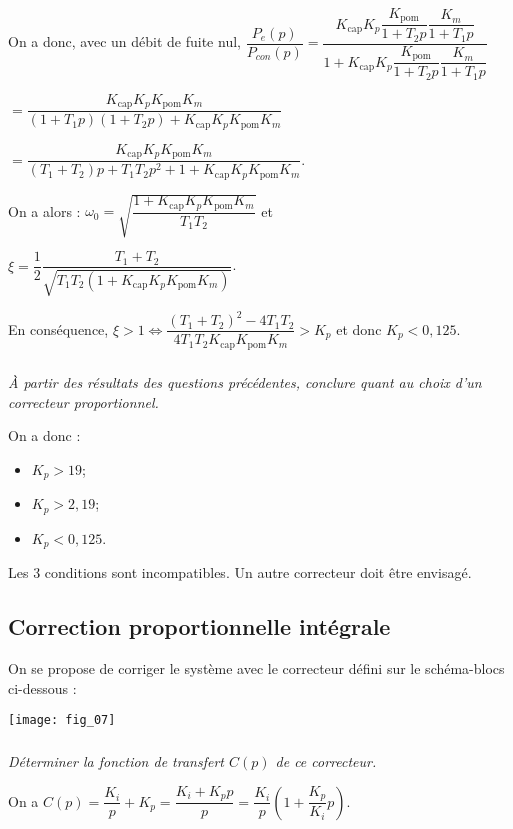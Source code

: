 \begin{multicols}{2}
\begin{corrige}
On a donc, avec un débit de fuite nul, $\dfrac{P_e(p)}{P_{con}(p)}
=\dfrac{K_{\text{cap}}K_p\dfrac{K_{\text{pom}}}{1+T_2 p}\dfrac{K_{m}}{1+T_1 p}}{1+K_{\text{cap}}K_p\dfrac{K_{\text{pom}}}{1+T_2 p}\dfrac{K_{m}}{1+T_1 p}}$

$=\dfrac{K_{\text{cap}}K_pK_{\text{pom}} K_{m}}{\left(1+T_1 p\right)\left(1+T_2 p\right)+K_{\text{cap}}K_pK_{\text{pom}} K_{m}}$


$=\dfrac{
K_{\text{cap}}K_pK_{\text{pom}} K_{m}
}{
\left(T_1 +  T_2\right) p + T_1T_2 p^2+1+K_{\text{cap}}K_pK_{\text{pom}} K_{m}
}$.

On a alors : $\omega_0 = \sqrt{\dfrac{1+K_{\text{cap}}K_pK_{\text{pom}} K_{m}}{T_1T_2}}$
et

$\xi=\dfrac{1}{2}\dfrac{T_1+T_2}{\sqrt{T_1T_2 \left(1+K_{\text{cap}}K_pK_{\text{pom}} K_{m}\right)}}$.
 
En conséquence, $\xi>1\Leftrightarrow \dfrac{\left(T_1+T_2\right)^2-4T_1T_2 }{4T_1T_2 K_{\text{cap}}K_{\text{pom}} K_{m}} > K_p $ et donc $K_p<0,125 $.

\end{corrige}
\else
\fi


\subparagraph{}
\textit{À partir des résultats des questions précédentes, conclure quant au choix d’un correcteur proportionnel.}
\ifprof
\begin{corrige}
On a donc : 
\begin{itemize}
\item $K_p>19$;
\item $K_p> 2,19$;
\item $K_p<0,125 $.
\end{itemize}
Les 3 conditions sont incompatibles. Un autre correcteur doit être envisagé.
\end{corrige}

\else
\fi

\subsection*{Correction proportionnelle intégrale}
On se propose de corriger le système avec le correcteur défini sur le schéma-blocs ci-dessous :
\begin{center}
\texttt{[image: fig\_07]}
\end{center}


\subparagraph{}
\textit{Déterminer la fonction de transfert $C(p)$ de ce correcteur.}
\ifprof
\begin{corrige}
On a $C(p)=\dfrac{K_i}{p}+K_p = \dfrac{K_i+K_p p}{p}= \dfrac{K_i}{p}\left(1+\dfrac{K_p}{K_i} p\right)$.
\end{corrige}
\else
\fi




\end{multicols}
